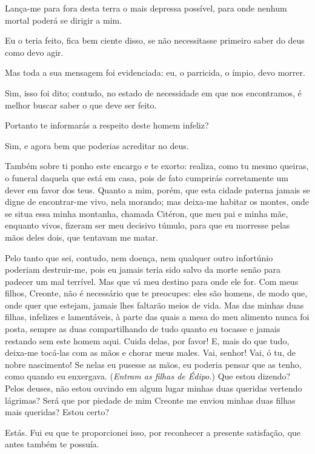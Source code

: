   Lança-me para fora desta terra o mais depressa possível, para onde
nenhum mortal poderá se dirigir a mim.

   Eu o teria feito, fica bem ciente disso, se não necessitasse primeiro
saber do deus como devo agir.

   Mas toda a sua mensagem foi evidenciada: eu, o parricida, o
ímpio, devo morrer.

   Sim, isso foi dito; contudo, no estado de necessidade em que nos
encontramos, é melhor buscar saber o que deve ser feito.

   Portanto te informarás a respeito deste homem infeliz?

   Sim, e agora bem que poderias acreditar no deus.

   Também sobre ti ponho este encargo e te exorto: realiza, como tu mesmo
queiras, o funeral daquela que está em casa, pois de fato cumprirás
corretamente um dever em favor dos teus. Quanto a mim, porém, que esta
cidade paterna jamais se digne de encontrar-me vivo, nela
morando; mas deixa-me habitar os montes, onde se situa essa minha
montanha, chamada Citéron, que meu pai e minha mãe, enquanto vivos,
fizeram ser meu decisivo túmulo, para que eu morresse pelas mãos deles
dois, que tentavam me matar.

Pelo tanto que sei, contudo, nem doença, nem qualquer outro infortúnio
poderiam destruir-me, pois eu jamais teria sido salvo da morte senão
para padecer um mal terrível. Mas que vá meu destino para onde ele for.
Com meus filhos, Creonte, não é necessário que te preocupes: eles
são homens, de modo que, onde quer que estejam, jamais lhes faltarão
meios de vida. Mas das minhas duas filhas, infelizes e lamentáveis, à
parte das quais a mesa do meu alimento nunca foi posta, sempre as duas
compartilhando de tudo quanto eu tocasse e jamais restando sem este
homem aqui. Cuida delas, por favor! E, mais do que tudo, deixa-me
tocá-las com as mãos e chorar meus males. Vai, senhor! Vai, ó tu, de
nobre nascimento! Se nelas eu pusesse as mãos, eu poderia pensar
que as tenho, como quando eu enxergava. (\emph{Entram as filhas de
Édipo.}) Que estou dizendo? Pelos deuses, não estou ouvindo em algum
lugar minhas duas queridas vertendo lágrimas? Será que por piedade de
mim Creonte me enviou minhas duas filhas mais queridas? Estou certo?

   Estás. Fui eu que te proporcionei isso, por reconhecer a presente
satisfação, que antes também te possuía.

